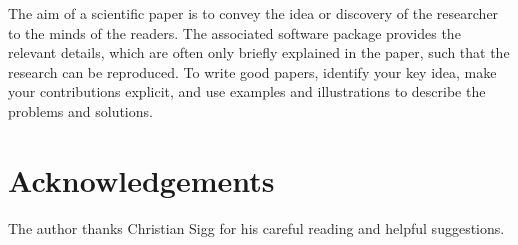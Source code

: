 \documentclass[10pt,conference,compsocconf]{IEEEtran}
\begin{document}
The aim of a scientific paper is to convey the idea or discovery of
the researcher to the minds of the readers. The associated software
package provides the relevant details, which are often only briefly
explained in the paper, such that the research can be reproduced.
To write good papers, identify your key idea, make your contributions
explicit, and use examples and illustrations to describe the problems
and solutions.

\section*{Acknowledgements}
The author thanks Christian Sigg for his careful reading and helpful
suggestions.



\end{document}

